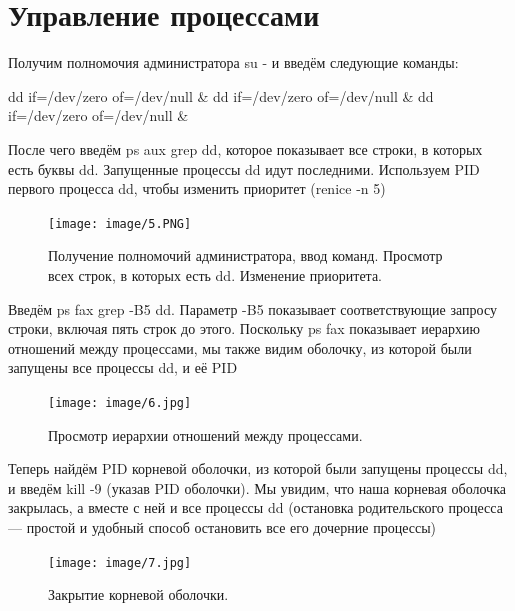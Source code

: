 \documentclass[
  english,
  russian,
  12pt,
  a4paper,
  DIV=11,
  numbers=noendperiod]{scrreprt}
\begin{document}
\section{Управление
процессами}\label{ux443ux43fux440ux430ux432ux43bux435ux43dux438ux435-ux43fux440ux43eux446ux435ux441ux441ux430ux43cux438}

Получим полномочия администратора su - и введём следующие команды:

dd if=/dev/zero of=/dev/null \& dd if=/dev/zero of=/dev/null \& dd
if=/dev/zero of=/dev/null \&

После чего введём ps aux \textbar{} grep dd, которое показывает все
строки, в которых есть буквы dd. Запущенные процессы dd идут последними.
Используем PID первого процесса dd, чтобы изменить приоритет (renice -n
5)

\begin{figure}

{\centering \texttt{[image: image/5.PNG]}

}

\caption{Получение полномочий администратора, ввод команд. Просмотр всех
строк, в которых есть dd. Изменение приоритета.}

\end{figure}%

Введём ps fax \textbar{} grep -B5 dd. Параметр -B5 показывает
соответствующие запросу строки, включая пять строк до этого. Поскольку
ps fax показывает иерархию отношений между процессами, мы также видим
оболочку, из которой были запущены все процессы dd, и её PID

\begin{figure}

{\centering \texttt{[image: image/6.jpg]}

}

\caption{Просмотр иерархии отношений между процессами.}

\end{figure}%

Теперь найдём PID корневой оболочки, из которой были запущены процессы
dd, и введём kill -9 (указав PID оболочки). Мы увидим, что наша корневая
оболочка закрылась, а вместе с ней и все процессы dd (остановка
родительского процесса --- простой и удобный способ остановить все его
дочерние процессы)

\begin{figure}

{\centering \texttt{[image: image/7.jpg]}

}

\caption{Закрытие корневой оболочки.}

\end{figure}%
\end{document}
